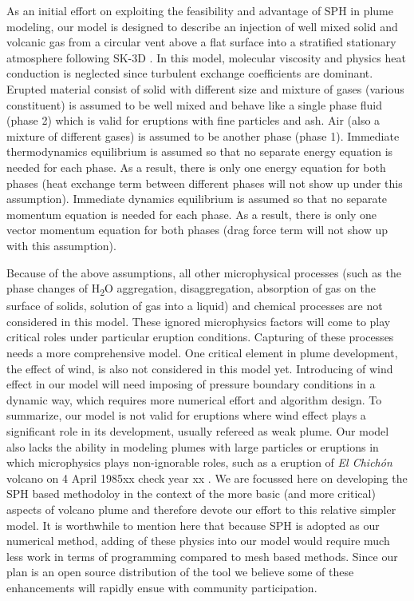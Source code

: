 \documentclass[journal abbreviation, manuscript]{copernicus}
\begin{document}
As an initial effort on exploiting the feasibility and advantage of SPH in plume modeling, our model is designed to describe an injection of well mixed solid and volcanic gas from a circular vent above a flat surface into a stratified stationary atmosphere following SK-3D \citep{suzuki2005numerical}. In this model, molecular viscosity and physics heat conduction is neglected since turbulent exchange coefficients are dominant. Erupted material consist of solid with different size and mixture of gases (various constituent) is assumed to be well mixed and behave like a single phase fluid (phase 2) which is valid for eruptions with fine particles and ash. Air (also a mixture of different gases) is assumed to be another phase (phase 1). Immediate thermodynamics equilibrium is assumed so that no separate energy equation is needed for each phase. As a result, there is only one energy equation for both phases (heat exchange term between different phases will not show up under this assumption). Immediate dynamics equilibrium is assumed so that no separate momentum equation is needed for each phase. As a result, there is only one vector momentum equation for both phases (drag force term will not show up with this assumption). 

Because of the above assumptions, all other microphysical processes (such as the phase changes of \texorpdfstring{H\textsubscript{2}O}, aggregation, disaggregation, absorption of gas on the surface of solids, solution of gas into a liquid) and chemical processes are not considered in this model. These ignored microphysics factors will come to play critical roles under particular eruption conditions. Capturing of these processes needs a more comprehensive model. One critical element in plume development, the effect of wind, is also not considered in this model yet. Introducing of wind effect in our model will need imposing of pressure boundary conditions in a dynamic way, which requires more numerical effort and algorithm design. To summarize, our model is not valid for eruptions where wind effect plays a significant role in its development, usually refereed as weak plume. Our model also lacks the ability in modeling plumes with large particles or eruptions in which microphysics plays non-ignorable roles, such as a eruption of \textit{El Chich{\'o}n} volcano on 4 April 1985xx check year xx \citep{sigurdsson19841982, folch2016fplume}. We are focussed here on developing the SPH based methodoloy in the context of the more basic (and more critical) aspects of volcano plume and therefore devote our effort to this relative simpler model. It is worthwhile to mention here that because SPH is adopted as our numerical method, adding of these physics into our model would require much less work in terms of programming compared to mesh based methods. Since our plan is an open source distribution of the tool we believe some of these enhancements will rapidly ensue with community participation.
\end{document}
